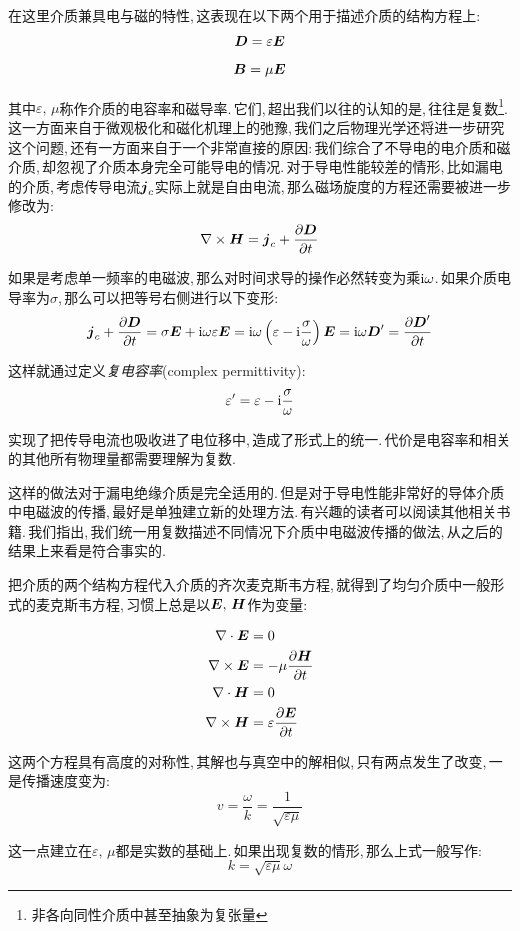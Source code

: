 在这里介质兼具电与磁的特性,\,这表现在以下两个用于描述介质的结构方程上:
\[\boldsymbol{D}=\varepsilon \boldsymbol{E}\]
\[\boldsymbol{B}=\mu \boldsymbol{E}\]

其中$\varepsilon,\,\mu$称作介质的电容率和磁导率.\,它们,\,超出我们以往的认知的是,\,往往是复数\footnote{非各向同性介质中甚至抽象为复张量}.\,这一方面来自于微观极化和磁化机理上的弛豫,\,我们之后物理光学还将进一步研究这个问题,\,还有一方面来自于一个非常直接的原因:\,我们综合了不导电的电介质和磁介质,\,却忽视了介质本身完全可能导电的情况.\,对于导电性能较差的情形,\,比如漏电的介质,\,考虑传导电流$ \boldsymbol{j}_c$实际上就是自由电流,\,那么磁场旋度的方程还需要被进一步修改为:
\[\nabla\times\boldsymbol{H} = \boldsymbol{j}_c+\frac{\partial \boldsymbol{D}}{\partial t}\]

如果是考虑单一频率的电磁波,\,那么对时间求导的操作必然转变为乘${\rm i}\omega$.\,如果介质电导率为$\sigma$,\,那么可以把等号右侧进行以下变形:
\[\boldsymbol{j}_c+\frac{\partial \boldsymbol{D}}{\partial t}=\sigma \boldsymbol{E}+{\rm i}\omega\varepsilon \boldsymbol{E}={\rm i}\omega\left(\varepsilon-{\rm i}\frac{\sigma}{\omega}\right)\boldsymbol{E}={\rm i}\omega \boldsymbol{D}' =\frac{\partial \boldsymbol{D}'}{\partial t}\]

这样就通过定义\emph{复电容率}(complex permittivity):
\[\varepsilon'=\varepsilon-{\rm i}\frac{\sigma}{\omega}\]

实现了把传导电流也吸收进了电位移中,\,造成了形式上的统一.\,代价是电容率和相关的其他所有物理量都需要理解为复数.

这样的做法对于漏电绝缘介质是完全适用的.\,但是对于导电性能非常好的导体介质中电磁波的传播,\,最好是单独建立新的处理方法.\,有兴趣的读者可以阅读其他相关书籍.\,我们指出,\,我们统一用复数描述不同情况下介质中电磁波传播的做法,\,从之后的结果上来看是符合事实的.

把介质的两个结构方程代入介质的齐次麦克斯韦方程,\,就得到了均匀介质中一般形式的麦克斯韦方程,\,习惯上总是以$\boldsymbol{E},\,\boldsymbol{H}$作为变量:

\begin{align*}
\nabla\cdot \boldsymbol{E} &=  0\\
\nabla\times \boldsymbol{E} &=   -\mu\frac{\partial \boldsymbol{H}}{\partial t} \\
\nabla\cdot \boldsymbol{H} &=  0 \\
\nabla\times\boldsymbol{H} &= \varepsilon\frac{\partial \boldsymbol{E}}{\partial t}
\end{align*}

这两个方程具有高度的对称性,\,其解也与真空中的解相似,\,只有两点发生了改变,\,一是传播速度变为:
\[v=\frac{\omega}{k}=\frac{1}{\sqrt{\varepsilon\mu}}\]

这一点建立在$\varepsilon,\,\mu$都是实数的基础上.\,如果出现复数的情形,\,那么上式一般写作:
\[k=\sqrt{\varepsilon\mu}\omega\]

